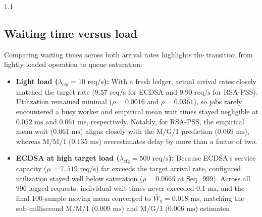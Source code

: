 \documentclass[11pt,a4paper]{article}
\begin{document}
\begin{spacing}{1.1}
\pagebreak

\subsection{Waiting time versus load}
Comparing waiting times across both arrival rates highlights the transition from lightly loaded operation to queue saturation:

\begin{itemize}
    \item \textbf{Light load ($\lambda_{\text{cfg}} = 10\text{ req/s}$):} With a fresh ledger, actual arrival rates closely matched the target rate ($9.57\text{ req/s}$ for ECDSA and $9.90\text{ req/s}$ for RSA-PSS). Utilization remained minimal ($\rho = 0.0016$ and $\rho = 0.0361$), so jobs rarely encountered a busy worker and empirical mean wait times stayed negligible at $0.052\text{ ms}$ and $0.061\text{ ms}$, respectively. Notably, for RSA-PSS, the empirical mean wait ($0.061\text{ ms}$) aligns closely with the M/G/1 prediction ($0.069\text{ ms}$), whereas M/M/1 ($0.135\text{ ms}$) overestimates delay by more than a factor of two.

    \item \textbf{ECDSA at high target load ($\lambda_{\text{cfg}} = 500\text{ req/s}$):} Because ECDSA's service capacity ($\mu = 7{,}519\text{ req/s}$) far exceeds the target arrival rate, configured utilization stayed well below saturation ($\rho = 0.0665$ at Seq.\ $999$). Across all $996$ logged requests, individual wait times never exceeded $0.1\text{ ms}$, and the final $100$-sample moving mean converged to $\bar{W}_q = 0.018\text{ ms}$, matching the sub-millisecond M/M/1 ($0.009\text{ ms}$) and M/G/1 ($0.006\text{ ms}$) estimates.


\end{itemize}
\end{spacing}
\end{document}
